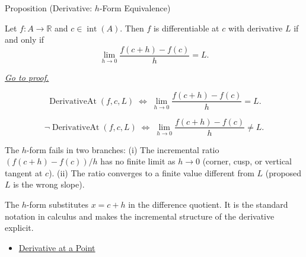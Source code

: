 
\begin{propositionbox}{Proposition (Derivative: $h$-Form Equivalence)}
\begin{proposition}
\label{prop:derivative-h-form-equivalence}
Let $f : A \to \mathbb{R}$ and $c \in \operatorname{int}(A)$. Then $f$ is differentiable at $c$ with derivative $L$ if and only if
\[
\lim_{h \to 0} \frac{f(c+h) - f(c)}{h} = L.
\]

\smallskip\noindent
\hyperref[prf:derivative-h-form-equivalence]{\textit{Go to proof.}}
\end{proposition}
\end{propositionbox}

\begin{remark*}
\[
\operatorname{DerivativeAt}(f,c,L)
\;\Longleftrightarrow\;
\lim_{h\to 0}\frac{f(c+h)-f(c)}{h} = L.
\]
\end{remark*}

\begin{remark*}
\[
\neg\operatorname{DerivativeAt}(f,c,L)
\;\Longleftrightarrow\;
\lim_{h\to 0}\frac{f(c+h)-f(c)}{h} \neq L.
\]
\end{remark*}

\begin{remark*}
The $h$-form fails in two branches: (i) The incremental ratio $(f(c+h)-f(c))/h$ has no finite limit as $h \to 0$ (corner, cusp, or vertical tangent at $c$). (ii) The ratio converges to a finite value different from $L$ (proposed $L$ is the wrong slope).
\end{remark*}

\begin{remark*}[Interpretation]
The $h$-form substitutes $x = c + h$ in the difference quotient. It is the standard notation in calculus and makes the incremental structure of the derivative explicit.
\end{remark*}

\begin{dependencies}
\begin{itemize}
  \item \hyperref[def:derivative-at-a-point]{Derivative at a Point}
\end{itemize}
\end{dependencies}


